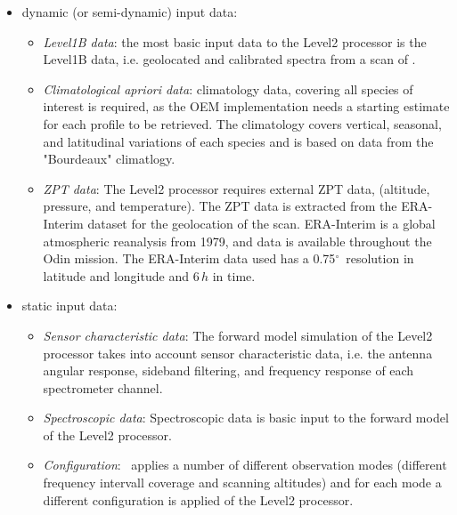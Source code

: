 \begin{itemize}
  \item dynamic (or semi-dynamic) input data:
  \begin{itemize}

    \item \emph{Level1B data}: the most basic input data to the 
    Level2 processor is the Level1B data, i.e. geolocated and 
    calibrated spectra from a scan of \smr.
    
    \item \emph{Climatological \textit{apriori} data}:
    climatology data, covering all species of interest is required, as
    the OEM implementation needs a starting estimate for each profile
    to be retrieved. The climatology covers vertical, seasonal,
    and latitudinal variations of each species and is based on data
    from the "Bourdeaux" climatlogy. %

    \item \emph{ZPT data}:
    The Level2 processor requires external ZPT data,
    (altitude, pressure, and temperature).
    The ZPT data is extracted from the ERA-Interim dataset for the geolocation
    of the scan. ERA-Interim is a global atmospheric reanalysis from 1979, and
    data is available throughout the Odin mission. The ERA-Interim data used
    has a 0.75\(^\circ\)\ resolution in latitude and longitude and 6\,\(h\)
    in time.
    
    

  \end{itemize}
  \item static input data:
  \begin{itemize}
    \item \emph{Sensor characteristic data}:
    The forward model simulation of the Level2 processor takes into account
    sensor characteristic data, i.e. the antenna angular response,
    sideband filtering, and frequency response of each spectrometer channel.

    \item \emph{Spectroscopic data}:
    Spectroscopic data is basic input to the forward model of the Level2
    processor.

    \item \emph{Configuration}:
    \smr\ applies a number of different observation modes
    (different frequency intervall coverage and scanning altitudes) 
    and for each mode a different configuration is applied
    of the Level2 processor.
  \end{itemize}
\end{itemize}



